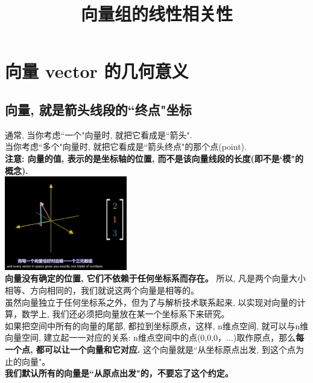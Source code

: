 \documentclass[UTF8]{ctexart}
\title{向量组的线性相关性}
\begin{document}
\tableofcontents %
\date{} %
\maketitle  %

\section{向量 vector 的几何意义}

\subsection{向量, 就是箭头线段的``终点"坐标}

通常, 当你考虑``一个"向量时, 就把它看成是``箭头". \\
当你考虑``多个"向量时, 就把它看成是``箭头终点"的那个点(point).\\

\textbf{注意: 向量的值, 表示的是坐标轴的位置, 而不是该向量线段的长度(即不是`模"的概念).}\\

\includegraphics[width=0.4\textwidth]{img/0066.png}\\


\textbf{向量没有确定的位置, 它们不依赖于任何坐标系而存在。} 所以, 凡是两个向量大小相等、方向相同的，我们就说这两个向量是相等的。\\

虽然向量独立于任何坐标系之外，但为了与解析技术联系起来, 以实现对向量的计算，数学上, 我们还必须把向量放在某一个坐标系下来研究。\\
如果把空间中所有的向量的尾部, 都拉到坐标原点，这样, n维点空间, 就可以与n维向量空间, 建立起一一对应的关系: n维点空间中的点(0,0,0，...)取作原点，那么\textbf{每一个点, 都可以让一个向量和它对应.} 这个向量就是``从坐标原点出发, 到这个点为止的向量"。\\
\textbf{我们默认所有的向量是``从原点出发"的，不要忘了这个约定。}\\
\end{document}
